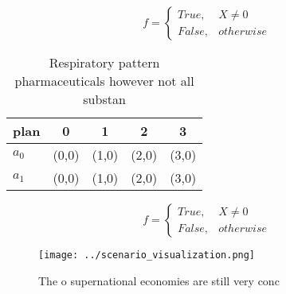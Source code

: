 \documentclass[a4paper]{article}
\begin{document}
\begin{equation}   f =
\begin{cases} True, & X \neq 0\\
False, & otherwise
\end{cases}
\end{equation}

\begin{table}
\begin{adjustbox}{width=0.5\columnwidth}
\begin{tabular}{|l|l|l|l|l|}
\hline
\textbf{plan} & \multicolumn{1}{c|}{\textbf{0}} & \multicolumn{1}{c|}{\textbf{1}} & \multicolumn{1}{c|}{\textbf{2}} & \multicolumn{1}{c|}{\textbf{3}} \\ \hline
\textbf{$a_0$}  & (0,0) & (1,0) & (2,0) & (3,0) \\ \hline
\textbf{$a_1$}  & (0,0) & (1,0) & (2,0) & (3,0) \\ \hline
\end{tabular}
\end{adjustbox}
\caption{Respiratory pattern pharmaceuticals however not all substan
}
\end{table}

\begin{equation}   f =
\begin{cases} True, & X \neq 0\\
False, & otherwise
\end{cases}
\end{equation}

\begin{figure}
\centering
\texttt{[image: ../scenario\_visualization.png]}
\caption{The o supernational economies are still very conc
}
\end{figure}
 
\end{document}
